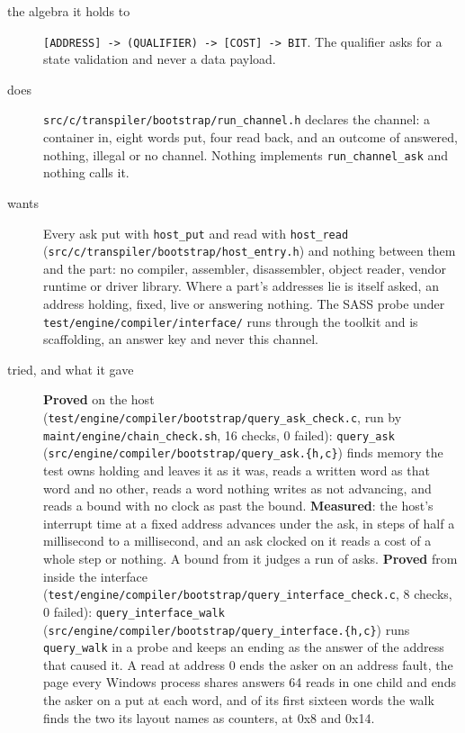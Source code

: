 \begin{description}
\item[{the algebra it holds to}] \texttt{[ADDRESS] -\allowbreak{}> (QUALIFIER) -\allowbreak{}> [COST] -\allowbreak{}> BIT}. The qualifier asks for a state validation and never a data payload.
\item[{does}] \texttt{src/\allowbreak{}c/\allowbreak{}transpiler/\allowbreak{}bootstrap/\allowbreak{}run\_\allowbreak{}channel.\allowbreak{}h} declares the channel: a container in, eight words put, four read back, and an outcome of answered, nothing, illegal or no channel. Nothing implements \texttt{run\_\allowbreak{}channel\_\allowbreak{}ask} and nothing calls it.
\item[{wants}] Every ask put with \texttt{host\_\allowbreak{}put} and read with \texttt{host\_\allowbreak{}read} (\texttt{src/\allowbreak{}c/\allowbreak{}transpiler/\allowbreak{}bootstrap/\allowbreak{}host\_\allowbreak{}entry.\allowbreak{}h}) and nothing between them and the part: no compiler, assembler, disassembler, object reader, vendor runtime or driver library. Where a part's addresses lie is itself asked, an address holding, fixed, live or answering nothing. The SASS probe under \texttt{test/\allowbreak{}engine/\allowbreak{}compiler/\allowbreak{}interface/\allowbreak{}} runs through the toolkit and is scaffolding, an answer key and never this channel.
\item[{tried, and what it gave}] \textbf{Proved} on the host (\texttt{test/\allowbreak{}engine/\allowbreak{}compiler/\allowbreak{}bootstrap/\allowbreak{}query\_\allowbreak{}ask\_\allowbreak{}check.\allowbreak{}c}, run by \texttt{maint/\allowbreak{}engine/\allowbreak{}chain\_\allowbreak{}check.\allowbreak{}sh}, 16 checks, 0 failed): \texttt{query\_\allowbreak{}ask} (\texttt{src/\allowbreak{}engine/\allowbreak{}compiler/\allowbreak{}bootstrap/\allowbreak{}query\_\allowbreak{}ask.\allowbreak{}\{h,c\}}) finds memory the test owns holding and leaves it as it was, reads a written word as that word and no other, reads a word nothing writes as not advancing, and reads a bound with no clock as past the bound. \textbf{Measured}: the host's interrupt time at a fixed address advances under the ask, in steps of half a millisecond to a millisecond, and an ask clocked on it reads a cost of a whole step or nothing. A bound from it judges a run of asks. \textbf{Proved} from inside the interface (\texttt{test/\allowbreak{}engine/\allowbreak{}compiler/\allowbreak{}bootstrap/\allowbreak{}query\_\allowbreak{}interface\_\allowbreak{}check.\allowbreak{}c}, 8 checks, 0 failed): \texttt{query\_\allowbreak{}interface\_\allowbreak{}walk} (\texttt{src/\allowbreak{}engine/\allowbreak{}compiler/\allowbreak{}bootstrap/\allowbreak{}query\_\allowbreak{}interface.\allowbreak{}\{h,c\}}) runs \texttt{query\_\allowbreak{}walk} in a probe and keeps an ending as the answer of the address that caused it. A read at address 0 ends the asker on an address fault, the page every Windows process shares answers 64 reads in one child and ends the asker on a put at each word, and of its first sixteen words the walk finds the two its layout names as counters, at 0x8 and 0x14.

\end{description}
